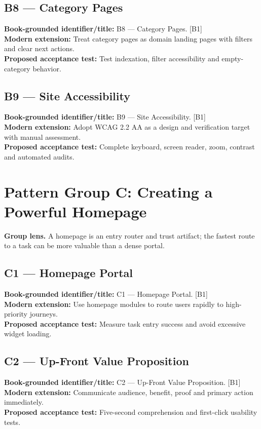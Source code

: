 \documentclass[11pt]{article}
\begin{document}
\subsection{B8 — Category Pages}
\noindent\textcolor{Ocean}{\textbf{Book-grounded identifier/title:}} B8 — Category Pages. [B1]\\
\textcolor{Mint}{\textbf{Modern extension:}} Treat category pages as domain landing pages with filters and clear next actions.\\
\textcolor{Amber}{\textbf{Proposed acceptance test:}} Test indexation, filter accessibility and empty-category behavior.\medskip
\subsection{B9 — Site Accessibility}
\noindent\textcolor{Ocean}{\textbf{Book-grounded identifier/title:}} B9 — Site Accessibility. [B1]\\
\textcolor{Mint}{\textbf{Modern extension:}} Adopt WCAG 2.2 AA as a design and verification target with manual assessment.\\
\textcolor{Amber}{\textbf{Proposed acceptance test:}} Complete keyboard, screen reader, zoom, contrast and automated audits.\medskip
\section{Pattern Group C: Creating a Powerful Homepage}

\begin{notebox}\textbf{Group lens.} A homepage is an entry router and trust artifact; the fastest route to a task can be more valuable than a dense portal.\end{notebox}
\subsection{C1 — Homepage Portal}
\noindent\textcolor{Ocean}{\textbf{Book-grounded identifier/title:}} C1 — Homepage Portal. [B1]\\
\textcolor{Mint}{\textbf{Modern extension:}} Use homepage modules to route users rapidly to high-priority journeys.\\
\textcolor{Amber}{\textbf{Proposed acceptance test:}} Measure task entry success and avoid excessive widget loading.\medskip
\subsection{C2 — Up-Front Value Proposition}
\noindent\textcolor{Ocean}{\textbf{Book-grounded identifier/title:}} C2 — Up-Front Value Proposition. [B1]\\
\textcolor{Mint}{\textbf{Modern extension:}} Communicate audience, benefit, proof and primary action immediately.\\
\textcolor{Amber}{\textbf{Proposed acceptance test:}} Five-second comprehension and first-click usability tests.\medskip
\end{document}
